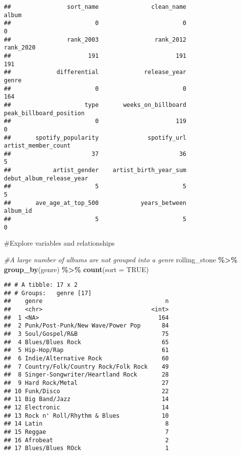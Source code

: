 \documentclass[
]{article}
\newenvironment{Shaded}{\begin{snugshade}}{\end{snugshade}}
\newcommand{\AttributeTok}[1]{\textcolor[rgb]{0.13,0.29,0.53}{#1}}
\newcommand{\CommentTok}[1]{\textcolor[rgb]{0.56,0.35,0.01}{\textit{#1}}}
\newcommand{\ConstantTok}[1]{\textcolor[rgb]{0.56,0.35,0.01}{#1}}
\newcommand{\FunctionTok}[1]{\textcolor[rgb]{0.13,0.29,0.53}{\textbf{#1}}}
\newcommand{\NormalTok}[1]{#1}
\newcommand{\SpecialCharTok}[1]{\textcolor[rgb]{0.81,0.36,0.00}{\textbf{#1}}}
\begin{document}
\begin{verbatim}
##                sort_name               clean_name                    album 
##                        0                        0                        0 
##                rank_2003                rank_2012                rank_2020 
##                      191                      191                      191 
##             differential             release_year                    genre 
##                        0                        0                      164 
##                     type       weeks_on_billboard  peak_billboard_position 
##                        0                      119                        0 
##       spotify_popularity              spotify_url      artist_member_count 
##                       37                       36                        5 
##            artist_gender    artist_birth_year_sum debut_album_release_year 
##                        5                        5                        5 
##       ave_age_at_top_500            years_between                 album_id 
##                        5                        5                        0
\end{verbatim}

\#Explore variables and relationships

\begin{Shaded}
\begin{Highlighting}[]
\CommentTok{\#A large number of albums are not grouped into a genre}
\NormalTok{rolling\_stone }\SpecialCharTok{\%\textgreater{}\%}
  \FunctionTok{group\_by}\NormalTok{(genre) }\SpecialCharTok{\%\textgreater{}\%}
  \FunctionTok{count}\NormalTok{(}\AttributeTok{sort =} \ConstantTok{TRUE}\NormalTok{)}
\end{Highlighting}
\end{Shaded}

\begin{verbatim}
## # A tibble: 17 x 2
## # Groups:   genre [17]
##    genre                                   n
##    <chr>                               <int>
##  1 <NA>                                  164
##  2 Punk/Post-Punk/New Wave/Power Pop      84
##  3 Soul/Gospel/R&B                        75
##  4 Blues/Blues Rock                       65
##  5 Hip-Hop/Rap                            61
##  6 Indie/Alternative Rock                 60
##  7 Country/Folk/Country Rock/Folk Rock    49
##  8 Singer-Songwriter/Heartland Rock       28
##  9 Hard Rock/Metal                        27
## 10 Funk/Disco                             22
## 11 Big Band/Jazz                          14
## 12 Electronic                             14
## 13 Rock n' Roll/Rhythm & Blues            10
## 14 Latin                                   8
## 15 Reggae                                  7
## 16 Afrobeat                                2
## 17 Blues/Blues ROck                        1
\end{verbatim}
\end{document}
